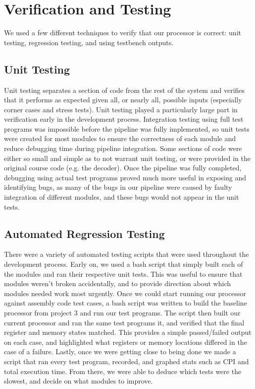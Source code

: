 \documentclass[10pt,journal,compsoc]{IEEEtran}
\begin{document}
\section{Verification and Testing}
We used a few different techniques to verify that our processor is correct: unit testing, regression testing, and using testbench outputs.
\subsection{Unit Testing}
Unit testing separates a section of code from the rest of the system and verifies that it performs as expected given all, or nearly all, possible inputs (especially corner cases and stress tests). Unit testing played a particularly large part in verification early in the development process. Integration testing using full test programs was impossible before the pipeline was fully implemented, so unit tests were created for most modules to ensure the correctness of each module and reduce debugging time during pipeline integration. Some sections of code were either so small and simple as to not warrant unit testing, or were provided in the original course code (e.g. the decoder). Once the pipeline was fully completed, debugging using actual test programs proved much more useful in exposing and identifying bugs, as many of the bugs in our pipeline were caused by faulty integration of different modules, and these bugs would not appear in the unit tests.

\subsection{Automated Regression Testing}
There were a variety of automated testing scripts that were used throughout the development process. Early on, we used a bash script that simply built each of the modules and ran their respective unit tests. This was useful to ensure that modules weren’t broken accidentally, and to provide direction about which modules needed work most urgently. Once we could start running our processor against assembly code test cases, a bash script was written to build the baseline processor from project 3 and run our test programs. The script then built our current processor and ran the same test programs it, and verified that the final register and memory states matched. This provides a simple passed/failed output on each case, and highlighted what registers or memory locations differed in the case of a failure. Lastly, once we were getting close to being done we made a script that ran every test program, recorded, and graphed stats such as CPI and total execution time. From there, we were able to deduce which tests were the slowest, and decide on what modules to improve.
\end{document}

